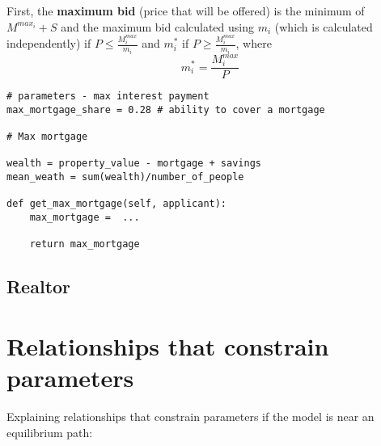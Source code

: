 First, the \textbf{maximum bid} (price that will be offered) is the minimum of $M^{max_i} +S$ and the maximum bid calculated using $m_i$ (which is calculated independently) if 
$P\le \frac{M_i^{max}}{m_i}$ 
and $m_i^*$ if 
$P\ge \frac{M_i^{max}}{m_i}$, where 
\[m_i^*=\frac{M_i^{max}}{P}\]

\begin{lstlisting}
# parameters - max interest payment 
max_mortgage_share = 0.28 # ability to cover a mortgage

# Max mortgage

wealth = property_value - mortgage + savings
mean_weath = sum(wealth)/number_of_people

def get_max_mortgage(self, applicant):
    max_mortgage =  ...
    
    return max_mortgage
\end{lstlisting}






\subsection{Realtor}




\section{Relationships that constrain parameters }

Explaining relationships that constrain parameters if the model is near an equilibrium path: 

